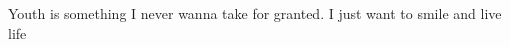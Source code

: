 
%


        
\begin{ntquote}
  Youth is something I never wanna take for granted. I just want to smile and live life%
\end{ntquote}
